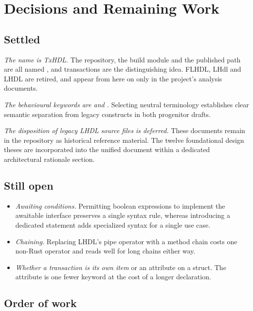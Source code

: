 \section{Decisions and Remaining Work}
\label{sec:decisions}

\subsection{Settled}

\emph{The name is TxHDL.} The repository, the build module and the published
path are all named , and transactions are the distinguishing
idea. FLHDL, LHdl and LHDL are retired, and appear from here on only in the
project's analysis documents.

\emph{The behavioural keywords are  and .} Selecting
neutral terminology establishes clear semantic separation from legacy
constructs in both progenitor drafts.

\emph{The disposition of legacy LHDL source files is deferred.} These
documents remain in the repository as historical reference material.
The twelve foundational design theses are incorporated into the unified
document within a dedicated architectural rationale section.

\subsection{Still open}

\begin{itemize}
  \item \emph{Awaiting conditions.} Permitting boolean expressions to implement
        the awaitable interface preserves a single syntax rule, whereas
        introducing a dedicated statement adds specialized syntax for a single
        use case.
  \item \emph{Chaining.} Replacing LHDL's pipe operator with a method chain
        costs one non-Rust operator and reads well for long chains either
        way.
  \item \emph{Whether a transaction is its own item} or an attribute on a
        struct. The attribute is one fewer keyword at the cost of a longer
        declaration.
\end{itemize}

\subsection{Order of work}

